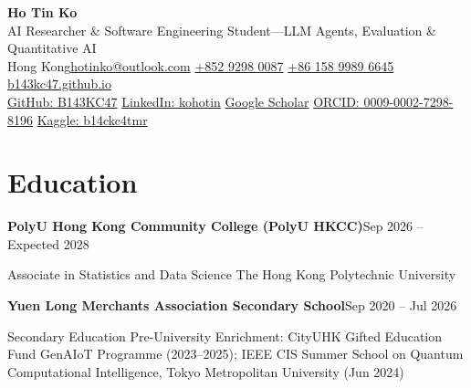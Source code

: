 \documentclass[10pt,a4paper]{article}
\newcommand{\targetrole}{AI Researcher \& Software Engineering Student}
\newcommand{\sep}{\hspace{0.48em}\textcolor{muted}{\textbar}\hspace{0.48em}}
\newcommand{\entry}[2]{\needspace{3\baselineskip}\textbf{#1}\hfill{\small\textcolor{accent}{#2}}\par}
\newcommand{\detail}[1]{{\fontsize{9.5}{11.2}\selectfont\textcolor{muted}{#1}\par}}
\newcommand{\gap}{\vspace{3.2pt}}
\begin{document}
\fontsize{10}{12.2}\selectfont

\begin{center}
  {\fontsize{21}{23}\selectfont\textbf{Ho Tin Ko}}\\[2.5pt]
  {\fontsize{10}{11.5}\selectfont\textcolor{accent}{\targetrole\enspace---\enspace LLM Agents, Evaluation \& Quantitative AI}}\\[3.5pt]
  {\small Hong Kong\sep\href{mailto:hotinko@outlook.com}{hotinko@outlook.com}\sep
  \href{tel:+85292980087}{+852 9298 0087}\sep
  \href{tel:+8615899896645}{+86 158 9989 6645}\sep
  \href{https://b143kc47.github.io/}{b143kc47.github.io}}\\[2pt]
  {\small\href{https://github.com/B143KC47}{GitHub: B143KC47}\sep
  \href{https://www.linkedin.com/in/kohotin/}{LinkedIn: kohotin}\sep
  \href{https://scholar.google.com/citations?user=gz7ciBUAAAAJ}{Google Scholar}\sep
  \href{https://orcid.org/0009-0002-7298-8196}{ORCID: 0009-0002-7298-8196}\sep
  \href{https://www.kaggle.com/b14ckc4tmr}{Kaggle: b14ckc4tmr}}
\end{center}

\vspace{-4pt}

\section*{Education}
\entry{PolyU Hong Kong Community College (PolyU HKCC)}{Sep 2026 -- Expected 2028}
\detail{Associate in Statistics and Data Science \textbar{} The Hong Kong Polytechnic University}
\gap
\entry{Yuen Long Merchants Association Secondary School}{Sep 2020 -- Jul 2026}
\detail{Secondary Education \textbar{} Pre-University Enrichment: CityUHK Gifted Education Fund GenAIoT Programme (2023--2025); IEEE CIS Summer School on Quantum Computational Intelligence, Tokyo Metropolitan University (Jun 2024)}
\end{document}
